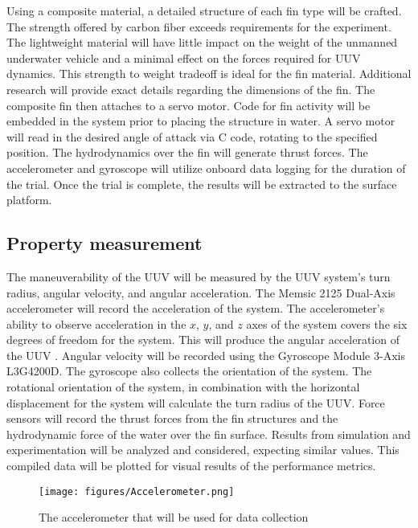 \documentclass{IEEEtran}
\begin{document}
Using a composite material, a detailed structure of each fin type will be crafted.  The strength offered by carbon fiber exceeds requirements for the experiment.  The lightweight material will have little impact on the weight of the unmanned underwater vehicle and a minimal effect on the forces required for UUV dynamics.  This strength to weight tradeoff is ideal for the fin material.  Additional research will provide exact details regarding the dimensions of the fin.  The composite fin then attaches to a servo motor.  Code for fin activity will be embedded in the system prior to placing the structure in water.  A servo motor will read in the desired angle of attack via C code, rotating to the specified position.  The hydrodynamics over the fin will generate thrust forces.  The accelerometer and gyroscope will utilize onboard data logging for the duration of the trial.  Once the trial is complete, the results will be extracted to the surface platform.  

\subsection{Property measurement}
The maneuverability of the UUV will be measured by the UUV system’s turn radius, angular velocity, and angular acceleration. The Memsic 2125 Dual-Axis accelerometer will record the acceleration of the system.  The accelerometer’s ability to observe acceleration in the $x$, $y$, and $z$ axes of the system covers the six degrees of freedom for the system.  This will produce the angular acceleration of the UUV \cite{parallax2013}.  Angular velocity will be recorded using the Gyroscope Module 3-Axis L3G4200D.  The gyroscope also collects the orientation of the system.  The rotational orientation of the system, in combination with the horizontal displacement for the system will calculate the turn radius of the UUV.  Force sensors will record the thrust forces from the fin structures and the hydrodynamic force of the water over the fin surface.  Results from simulation and experimentation will be analyzed and considered, expecting similar values.  This compiled data will be plotted for visual results of the performance metrics.  
\begin{figure}
\begin{center}
\texttt{[image: figures/Accelerometer.png]}
\end{center}
\caption{The accelerometer that will be used for data collection \cite{parallax2013}}
\label{fig:6}
\end{figure}
\end{document}
